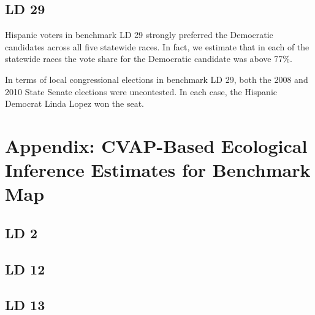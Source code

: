 \documentclass[12pt]{article}
\begin{document}
\subsection{LD 29}

Hispanic voters in benchmark LD 29 strongly preferred the Democratic
candidates across all five statewide races. In fact, we estimate that
in each of the statewide races the vote share for the Democratic
candidate was above 77\%.

In terms of local congressional elections in benchmark LD 29, both the
2008 and 2010 State Senate elections were uncontested. In each case,
the Hispanic Democrat Linda Lopez won the seat.

\clearpage
\appendix

\section{Appendix: CVAP-Based Ecological Inference Estimates for Benchmark Map}

\subsection{LD 2}









\clearpage

\subsection{LD 12}







\clearpage
\begin{landscape}

\end{landscape}
\clearpage



\clearpage


\subsection{LD 13}
\end{document}
